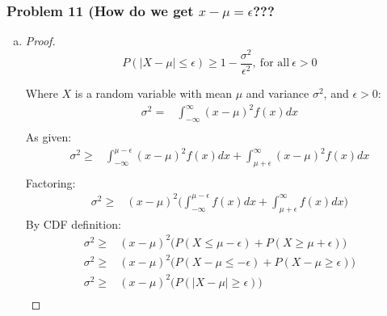 \documentclass[11pt]{extarticle}
\begin{document}
\subsubsection*{Problem 11 (How do we get $x-\mu=\epsilon$???}

\begin{enumerate}[(a)]

\item \begin{proof}
$$P( |X - \mu| \leq \epsilon) \geq 1 - \frac{\sigma^2}{\epsilon^2},\ \text{for all}\ \epsilon > 0$$

Where $X$ is a random variable with mean $\mu$ and variance $\sigma^2$, and $\epsilon > 0$: \begin{equation*} \begin{split} \sigma^2 = & \int_{-\infty}^{\infty} (x-\mu)^2 f(x) dx \\  
\end{split} 
\end{equation*}
As given: \begin{equation*} \begin{split}
\sigma^2 \geq & \int_{-\infty}^{\mu-\epsilon} (x-\mu)^2 f(x) dx + \int_{\mu+\epsilon}^{\infty} (x-\mu)^2 f(x) dx \\ 
\end{split} 
\end{equation*}
Factoring: \begin{equation*} \begin{split} \sigma^2 \geq & (x-\mu)^2 \Big( \int_{-\infty}^{\mu-\epsilon} f(x) dx + \int_{\mu+\epsilon}^{\infty} f(x) dx \Big) 
\end{split} 
\end{equation*}
By CDF definition: %
\begin{equation*}
\begin{split}
\sigma^2 \geq & (x-\mu)^2 \Big( P(X \leq \mu-\epsilon) + P(X \geq \mu+\epsilon ) \Big) \\
\sigma^2 \geq & (x-\mu)^2 \Big( P( X - \mu \leq -\epsilon) + P(X - \mu \geq \epsilon ) \Big) \\
\sigma^2 \geq & (x-\mu)^2 \Big(  P(|X - \mu| \geq \epsilon ) \Big) \\
\end{split} 
\end{equation*}


\end{proof}
\end{enumerate}
\end{document}

